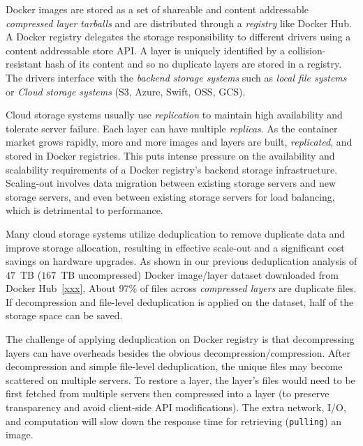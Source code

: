 Docker images are stored as a set of shareable and content addressable \emph{compressed layer tarballs} 
and are distributed through a \emph{registry} like Docker Hub.
A Docker registry delegates the storage responsibility to different drivers using a content addressable store API.
A layer is uniquely identified by a collision-resistant hash of its content and so no duplicate layers are stored in a registry.
The drivers interface with the \emph{backend storage systems}
such as \emph{local file systems} or \emph{Cloud storage systems} (\eg S3, Azure, Swift, OSS, GCS).


Cloud storage systems usually use \emph{replication} to maintain high availability and tolerate server failure.
Each layer can have multiple \emph{replicas}.
As the container market grows rapidly, 
more and more images and layers are built, \emph{replicated}, and stored in Docker registries.
This puts intense pressure on the availability and scalability requirements of a Docker registry's backend storage infrastructure. 
Scaling-out involves data migration between existing storage servers and new storage servers, 
and even between existing storage servers for load balancing,
which is detrimental to performance.

Many cloud storage systems utilize deduplication to remove duplicate data and improve storage allocation, resulting in
effective scale-out and a significant cost savings on hardware upgrades.
As shown in our previous deduplication analysis of $47$~TB ($167$~TB uncompressed) 
Docker image/layer dataset downloaded from Docker Hub~\ref{xxx},
About $97$\% of files across \emph{compressed layers} are duplicate files.
If decompression and file-level deduplication is applied on the dataset, %
half of the storage space can be saved.

The challenge of applying deduplication on Docker registry 
is that decompressing layers can have overheads besides the obvious decompression/compression. 
After decompression and simple file-level deduplication, 
the unique files may become scattered on
multiple servers. 
To restore a %
layer,
the layer's files would need to be first fetched from multiple servers then compressed into a layer (to preserve transparency and avoid client-side API modifications).
The extra network, I/O, and computation will slow down the response time for retrieving (\texttt{pulling}) an image.

